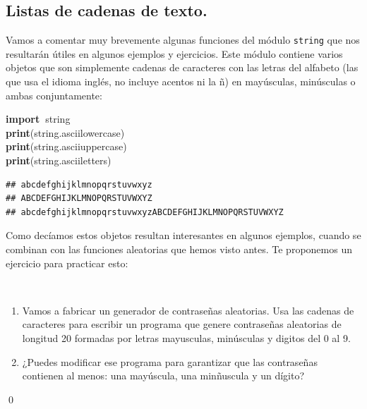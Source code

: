 \documentclass[10pt,a4paper]{article}\usepackage[]{graphicx}\usepackage[]{color}
\makeatletter
\newcommand{\hlopt}[1]{\textcolor[rgb]{0,0,0}{#1}}%
\newcommand{\hlstd}[1]{\textcolor[rgb]{0.345,0.345,0.345}{#1}}%
\newcommand{\hlkwa}[1]{\textcolor[rgb]{0.161,0.373,0.58}{\textbf{#1}}}%
\newenvironment{kframe}{%
 \def\at@end@of@kframe{}%
 \ifinner\ifhmode%
  \def\at@end@of@kframe{\end{minipage}}%
  \begin{minipage}{\columnwidth}%
 \fi\fi%
 \def\FrameCommand##1{\hskip\@totalleftmargin \hskip-\fboxsep
 \colorbox{shadecolor}{##1}\hskip-\fboxsep
     \hskip-\linewidth \hskip-\@totalleftmargin \hskip\columnwidth}%
 \MakeFramed {\advance\hsize-\width
   \@totalleftmargin\z@ \linewidth\hsize
   \@setminipage}}%
 {\par\unskip\endMakeFramed%
 \at@end@of@kframe}
\newenvironment{knitrout}{}{} %
\newcounter {cont01}
\makeatother
\begin{document}
\subsection{Listas de cadenas de texto. }

Vamos a comentar muy brevemente algunas funciones del módulo {\tt string} que nos resultarán útiles en algunos ejemplos y ejercicios. Este módulo contiene varios objetos que son simplemente cadenas de caracteres con las letras del alfabeto (las que usa el idioma inglés, no incluye acentos ni la ñ) en mayúsculas, minúsculas o ambas conjuntamente:
\begin{knitrout}
\color{fgcolor}\begin{kframe}
\noindent
\ttfamily
\hlstd{}\hlkwa{import\ }\hlstd{string}\hspace*{\fill}\\
\hlkwa{print}\hlstd{}\hlopt{(}\hlstd{string}\hlopt{.}\hlstd{ascii\textunderscore lowercase}\hlopt{)}\hspace*{\fill}\\
\hlstd{}\hlkwa{print}\hlstd{}\hlopt{(}\hlstd{string}\hlopt{.}\hlstd{ascii\textunderscore uppercase}\hlopt{)}\hspace*{\fill}\\
\hlstd{}\hlkwa{print}\hlstd{}\hlopt{(}\hlstd{string}\hlopt{.}\hlstd{ascii\textunderscore letters}\hlopt{)}\hlstd{}\hspace*{\fill}
\mbox{}
\normalfont

\begin{verbatim}
## abcdefghijklmnopqrstuvwxyz
## ABCDEFGHIJKLMNOPQRSTUVWXYZ
## abcdefghijklmnopqrstuvwxyzABCDEFGHIJKLMNOPQRSTUVWXYZ
\end{verbatim}
\end{kframe}
\end{knitrout}
Como decíamos estos objetos resultan interesantes en algunos ejemplos, cuando se combinan con las funciones aleatorias que hemos visto antes. Te proponemos un ejercicio para practicar esto:
\begin{ejercicio}
\label{tut02:ejercicio27}
\quad\\
\begin{enumerate}
\item Vamos a fabricar un generador de contraseñas aleatorias. Usa las cadenas de caracteres para escribir un programa que genere contraseñas aleatorias de longitud 20 formadas por letras mayusculas, minúsculas y digitos del 0 al 9.
\item ¿Puedes modificar ese programa para garantizar que las contraseñas contienen al menos: una mayúscula, una minñuscula y un dígito?
\end{enumerate}
\qed
\end{ejercicio}
\end{document}
